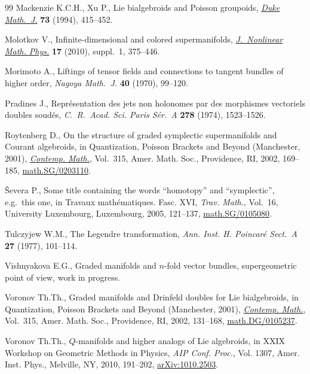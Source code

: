 \documentclass[pdftex]{sigma}
\numberwithin{equation}{section}
\begin{document}
\begin{thebibliography}{99}
Mackenzie K.C.H., Xu P., Lie bialgebroids and {P}oisson groupoids, \href{http://dx.doi.org/10.1215/S0012-7094-94-07318-3}{\textit{Duke
  Math.~J.}} \textbf{73} (1994), 415--452.

Molotkov V., Inf\/inite-dimensional and colored supermanifolds,
  \href{http://dx.doi.org/10.1142/S140292511000088X}{\textit{J.~Nonlinear Math. Phys.}} \textbf{17} (2010), suppl.~1, 375--446.

Morimoto A., Liftings of tensor f\/ields and connections to tangent bundles of
  higher order, \textit{Nagoya Math.~J.} \textbf{40} (1970), 99--120.

Pradines J., Repr\'esentation des jets non holonomes par des morphismes
  vectoriels doubles soud\'es, \textit{C.~R.~Acad. Sci. Paris S\'er.~A}
  \textbf{278} (1974), 1523--1526.

Roytenberg D., On the structure of graded symplectic supermanifolds and
  {C}ourant algebroids, in Quantization, {P}oisson Brackets and Beyond
  ({M}anchester, 2001), \href{http://dx.doi.org/10.1090/conm/315/05479}{\textit{Contemp. Math.}}, Vol.~315, Amer. Math. Soc.,
  Providence, RI, 2002, 169--185, \href{http://arxiv.org/abs/math.SG/0203110}{math.SG/0203110}.

{\v{S}}evera P., Some title containing the words ``homotopy'' and
  ``symplectic'', e.g.\ this one, in Travaux math\'ematiques. {F}asc. {XVI},
  \textit{Trav. Math.}, Vol.~16, University Luxembourg, Luxembourg, 2005,
  121--137, \href{http://arxiv.org/abs/math.SG/0105080}{math.SG/0105080}.

Tulczyjew W.M., The {L}egendre transformation, \textit{Ann. Inst. H. Poincar\'e
  Sect.~A} \textbf{27} (1977), 101--114.

Vishnyakova E.G., Graded manifolds and $n$-fold vector bundles, supergeometric
  point of view, work in progress.

Voronov Th.Th., Graded manifolds and {D}rinfeld doubles for {L}ie bialgebroids,
  in Quantization, {P}oisson Brackets and Beyond ({M}anchester, 2001),
  \href{http://dx.doi.org/10.1090/conm/315/05478}{\textit{Contemp. Math.}}, Vol.~315, Amer. Math. Soc., Providence, RI, 2002,
  131--168, \href{http://arxiv.org/abs/math.DG/0105237}{math.DG/0105237}.

Voronov Th.Th., {$Q$}-manifolds and higher analogs of {L}ie algebroids, in X{XIX}
  {W}orkshop on {G}eometric {M}e\-thods in {P}hysics, \textit{AIP Conf. Proc.},
  Vol. 1307, Amer. Inst. Phys., Melville, NY, 2010, 191--202,
  \href{http://arxiv.org/abs/1010.2503}{arXiv:1010.2503}.


\end{thebibliography}
\end{document}
